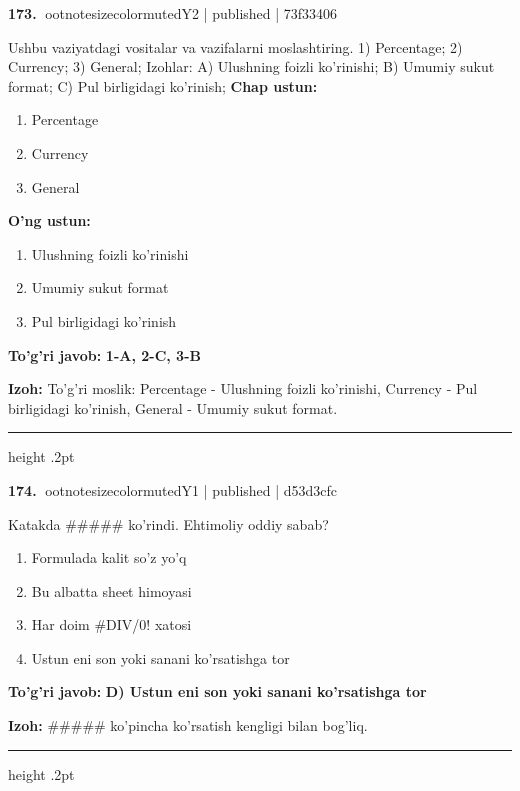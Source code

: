 \documentclass[10pt,a4paper]{article}
\begin{document}
\textbf{\color{ink}173.} {ootnotesizecolor{muted}Y2 | published | 73f33406}
\par
Ushbu vaziyatdagi vositalar va vazifalarni moslashtiring.  1) Percentage;  2) Currency;  3) General;  Izohlar: A) Ulushning foizli ko'rinishi;  B) Umumiy sukut format;  C) Pul birligidagi ko'rinish;
\textbf{Chap ustun:}\begin{enumerate}[label=\arabic*),leftmargin=9mm]
\item Percentage
\item Currency
\item General
\end{enumerate}
\textbf{O'ng ustun:}\begin{enumerate}[label=\Alph*),leftmargin=9mm]
\item Ulushning foizli ko'rinishi
\item Umumiy sukut format
\item Pul birligidagi ko'rinish
\end{enumerate}
\begin{tcolorbox}[enhanced,breakable,colback=teal!4,colframe=teal!55!black,boxrule=0.45pt,arc=1.2mm,left=2.8mm,right=2.8mm,top=2mm,bottom=2mm]
\textbf{\color{teal}To'g'ri javob:} \textbf{1-A, 2-C, 3-B}
\par\smallskip
\textbf{Izoh:} To'g'ri moslik: Percentage - Ulushning foizli ko'rinishi, Currency - Pul birligidagi ko'rinish, General - Umumiy sukut format.
\end{tcolorbox}
\vspace{2mm}\hrule height .2pt\vspace{2mm}

\textbf{\color{ink}174.} {ootnotesizecolor{muted}Y1 | published | d53d3cfc}
\par
Katakda \#\#\#\#\# ko'rindi. Ehtimoliy oddiy sabab?
\begin{enumerate}[label=\Alph*),leftmargin=9mm]
\item Formulada kalit so'z yo'q
\item Bu albatta sheet himoyasi
\item Har doim \#DIV/0! xatosi
\item Ustun eni son yoki sanani ko'rsatishga tor
\end{enumerate}
\begin{tcolorbox}[enhanced,breakable,colback=teal!4,colframe=teal!55!black,boxrule=0.45pt,arc=1.2mm,left=2.8mm,right=2.8mm,top=2mm,bottom=2mm]
\textbf{\color{teal}To'g'ri javob:} \textbf{D) Ustun eni son yoki sanani ko'rsatishga tor}
\par\smallskip
\textbf{Izoh:} \#\#\#\#\# ko'pincha ko'rsatish kengligi bilan bog'liq.
\end{tcolorbox}
\vspace{2mm}\hrule height .2pt\vspace{2mm}
\end{document}

